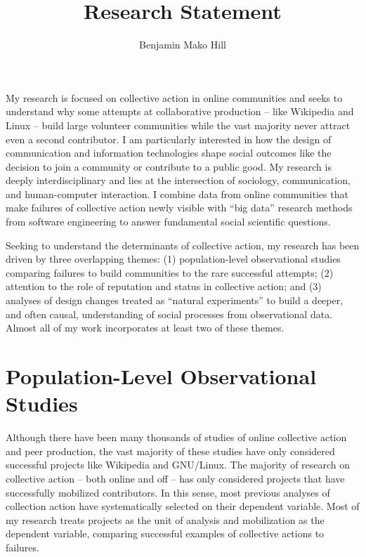 \documentclass[10pt]{memoir}
\begin{document}
\setlength{\parskip}{4.5pt}

\baselineskip 14.5pt

\title{Research Statement}
\author{Benjamin Mako Hill}

\maketitle

My research is focused on collective action in online communities and
seeks to understand why some attempts at collaborative production --
like Wikipedia and Linux -- build large volunteer communities while
the vast majority never attract even a second contributor. I am
particularly interested in how the design of communication and
information technologies shape social outcomes like the decision to
join a community or contribute to a public good. My research is deeply
interdisciplinary and lies at the intersection of sociology,
communication, and human-computer interaction. I combine data from
online communities that make failures of collective action newly
visible with ``big data'' research methods from software engineering
to answer fundamental social scientific questions.

Seeking to understand the determinants of collective action, my
research has been driven by three overlapping themes: (1)
population-level observational studies comparing failures to build
communities to the rare successful attempts; (2) attention to the role
of reputation and status in collective action; and (3) analyses of
design changes treated as ``natural experiments'' to build a deeper,
and often causal, understanding of social processes from observational
data. Almost all of my work incorporates at least two of these themes.

\section{Population-Level Observational Studies}

Although there have been many thousands of studies of online
collective action and peer production, the vast majority of these
studies have only considered successful projects like Wikipedia and
GNU/Linux.  The majority of research on collective action -- both
online and off -- has only considered projects that have successfully
mobilized contributors. In this sense, most previous analyses of
collection action have systematically selected on their dependent
variable. Most of my research treats projects as the unit of analysis
and mobilization as the dependent variable, comparing successful
examples of collective actions to failures.
\end{document}
